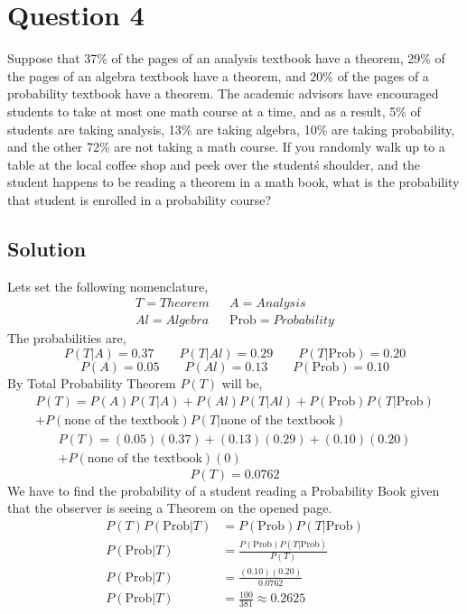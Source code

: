 \documentclass[a4paper, 11pt]{article}
\begin{document}
\section*{Question 4}
Suppose that 37\% of the pages of an analysis textbook have a theorem, 29\% of the pages
of  an  algebra  textbook  have  a  theorem,  and  20\%  of  the  pages  of  a  probability  textbook
have a theorem.  The academic advisors have encouraged students to take at most one math
course at a time, and as a result, 5\% of students are taking analysis, 13\% are taking algebra,
10\% are taking probability, and the other 72\% are not taking a math course.
If you randomly walk up to a table at the local coffee shop and peek over the student\'s
shoulder,  and  the  student  happens  to  be  reading  a  theorem  in  a  math  book,  what  is  the
probability that student is enrolled in a probability course?
\subsection*{Solution}
Lets set the following nomenclature,
\begin{align*}
    T=Theorem  &  & A=Analysis              \\
    Al=Algebra &  & \text{Prob}=Probability
\end{align*}
The probabilities are,
\begin{equation*}
    P(T|A)=0.37 \qquad P(T|Al)=0.29 \qquad P(T|\text{Prob})=0.20
\end{equation*}
\begin{equation*}
    P(A)=0.05 \qquad P(Al)=0.13 \qquad P(\text{Prob})=0.10
\end{equation*}
By Total Probability Theorem $P(T)$ will be,
\begin{multline*}
    P(T)=P(A)P(T|A)+P(Al)P(T|Al)+P(\text{Prob})P(T|\text{Prob})\\
    +P(\text{none of the textbook})P(T|\text{none of the textbook})
\end{multline*}
\begin{multline*}
    P(T)=(0.05)(0.37)+(0.13)(0.29)+(0.10)(0.20)\\
    +P(\text{none of the textbook})(0)
\end{multline*}
\[P(T)=0.0762\]
We have to find the probability of a student reading a Probability Book given that the observer is
seeing a Theorem on the opened page.
\begin{equation*}
    \begin{split}
        P(T)P(\text{Prob}|T)&=P(\text{Prob})P(T|\text{Prob})\\
        P(\text{Prob}|T)&=\frac{P(\text{Prob})P(T|\text{Prob})}{P(T)}\\
        P(\text{Prob}|T)&=\frac{(0.10)(0.20)}{0.0762}\\
        P(\text{Prob}|T)&=\frac{100}{381}\approx 0.2625
    \end{split}
\end{equation*}
\end{document}
